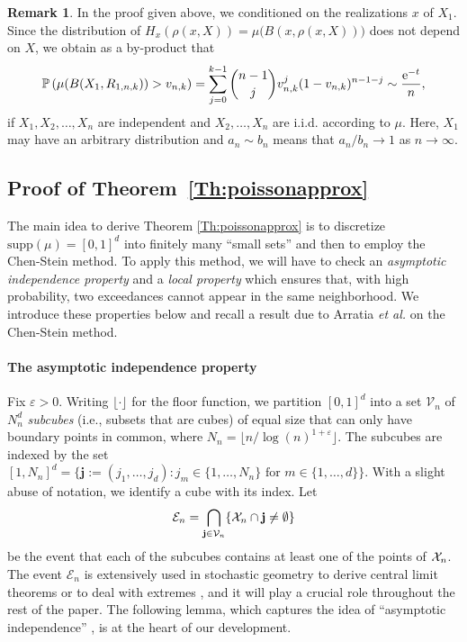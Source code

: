 \documentclass{article}
\theoremstyle{thm}
\theoremstyle{definition}
\newtheorem{remark}[theorem]{Remark}
\theoremstyle{definition}
\theoremstyle{def}
\newcommand{\PP}{\mathbb{P}} %
\newcommand{\jj}{\mathbf{j}}
\newcommand{\VV}{\mathcal{V}_n}
\begin{document}
\begin{remark}\label{rem-byproduct}
In the proof given above, we conditioned on the realizations $x$ of $X_1$. Since the distribution of $H_x(\rho(x,X)) = \mu\big(B(x,\rho(x,X))\big)$ does
not depend on $X$, we obtain as a by-product that
\[
\PP\left(\mu (B(X_1,R_{1,n,k})) > v_{n,k} \right)  = \sum_{j=0}^{k-1} {n-1 \choose j} v_{n,k}^j (1-v_{n,k})^{n-1-j} \sim \frac{{\rm e}^{-t}}{n},
\]
if $X_1,X_2,\ldots,X_n$ are independent and $X_2,\ldots,X_n$ are i.i.d. according to $\mu$. Here, $X_1$ may have an arbitrary distribution and $a_n \sim b_n$ means that $a_n/b_n \to 1$ as $n \to \infty$.
\end{remark}



\subsection{Proof of Theorem~\ref{Th:poissonapprox}}
The main idea to derive Theorem \ref{Th:poissonapprox} is to discretize {$\text{supp}(\mu)=[0,1]^d$} into finitely many ``small sets''
and then to employ the Chen-Stein method. To apply this method, we will have to check an  \textit{asymptotic independence property}
and a \textit{local property} which ensures that, with high probability,  two exceedances cannot appear in the same neighborhood.
We introduce these properties below and recall a result due to Arratia \textit{et al.} \cite{AGG} on the Chen-Stein method.

\paragraph{The asymptotic independence property}
Fix $\varepsilon > 0$. Writing $\lfloor \cdot \rfloor$ for the floor function, we partition {$[0,1]^d$} into a set $\VV$ of $N_n^d$  \textit{subcubes} (i.e., subsets that are cubes)
 of equal size that can only have boundary points in common, where $N_n=\lfloor n/\log(n)^{1+\varepsilon}\rfloor$. The subcubes are indexed
by the set  $\left[ 1,N_n\right] ^{d} = \{\jj:=(j_{1},\ldots, j_{d}): j_m \in \{1, \ldots, N_n\} \text{ for } m \in \{1,\ldots,d\}\}$.
With a slight abuse of notation, we identify a cube with its index.  Let
\[
\mathcal{E}_n = \bigcap_{\jj\in \VV}\{{\cal X}_n\cap \jj\neq \emptyset\}
\]
be the event that each of the subcubes contains at least one of the points of ${\cal X}_n$.
    The event $\mathcal{E}_n$ is extensively used in stochastic geometry to derive central limit theorems or to deal with extremes \cite{AB, BC, CR},
    and it will play a crucial role throughout  the rest of the paper. The following lemma, which captures the idea of ``asymptotic independence''  ,
     is at the heart of our development.
\end{document}
